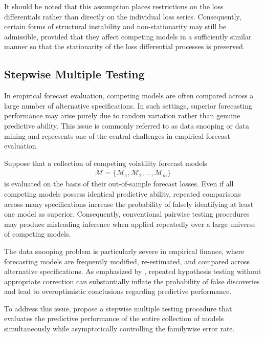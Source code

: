 \documentclass{article} %
\begin{document}
	It should be noted that this assumption places restrictions on the loss differentials rather than directly on the individual loss series. Consequently, certain forms of structural instability and non-stationarity may still be admissible, provided that they affect competing models in a sufficiently similar manner so that the stationarity of the loss differential processes is preserved. 
	
	\subsection{Stepwise Multiple Testing}\label{sec:stepwise-testing}
	
	In empirical forecast evaluation, competing models are often compared across a large number of alternative specifications. In such settings, superior forecasting performance may arise purely due to random variation rather than genuine predictive ability. This issue is commonly referred to as data snooping or data mining and represents one of the central challenges in empirical forecast evaluation.
	
	Suppose that a collection of competing volatility forecast models
	\begin{align}
		\mathcal{M} = \{\mathcal{M}_1, \mathcal{M}_2, \dots, \mathcal{M}_m\}
	\end{align}
	is evaluated on the basis of their out-of-sample forecast losses. Even if all competing models possess identical predictive ability, repeated comparisons across many specifications increase the probability of falsely identifying at least one model as superior. Consequently, conventional pairwise testing procedures may produce misleading inference when applied repeatedly over a large universe of competing models.
	
	The data snooping problem is particularly severe in empirical finance, where forecasting models are frequently modified, re-estimated, and compared across alternative specifications. As emphasized by \textcite{ROMANOWOLF2005}, repeated hypothesis testing without appropriate correction can substantially inflate the probability of false discoveries and lead to overoptimistic conclusions regarding predictive performance. 
	
	To address this issue, \textcite{ROMANOWOLF2005} propose a stepwise multiple testing procedure that evaluates the predictive performance of the entire collection of models simultaneously while asymptotically controlling the familywise error rate.
	
\end{document}
